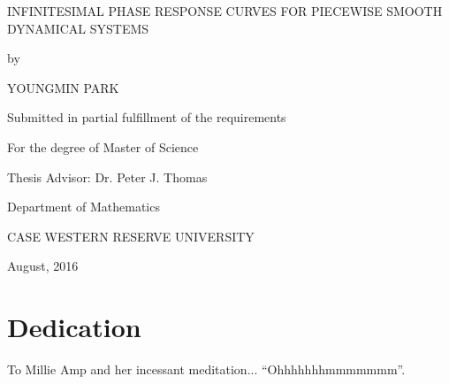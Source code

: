 \documentclass[12pt]{article}
\begin{document}
\pagestyle{empty}
\begin{titlepage}
\begin{center}
INFINITESIMAL PHASE RESPONSE CURVES FOR PIECEWISE SMOOTH DYNAMICAL SYSTEMS\end{center}
\vfill
\begin{center}
by
\end{center}
\begin{center}
YOUNGMIN PARK
\end{center}
\vfill
\begin{center}
Submitted in partial fulfillment of the requirements
\end{center}
\begin{center}
For the degree of Master of Science
\end{center}
\vfill
\begin{center}
Thesis Advisor:  Dr. Peter J. Thomas\\
\end{center}
\vfill
\begin{center}
Department of Mathematics\\ 
\end{center}
\begin{center}
CASE WESTERN RESERVE UNIVERSITY
\end{center}
\vfill
\begin{center}
August, 2016
\vfill
\end{center}
\end{titlepage}


\newpage

\section*{Dedication}
To Millie Amp and her incessant meditation... ``Ohhhhhhhmmmmmmm''.
\newpage

\pagestyle{plain}
\tableofcontents
\newpage

\listoftables
{}
\newpage

\listoffigures
{}
\newpage
\end{document}
